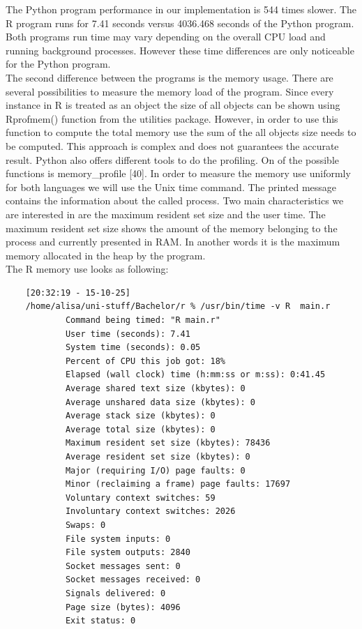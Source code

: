 \documentclass[
  twoside,
  11pt, a4paper,
  footinclude=true,
  headinclude=true,
  cleardoublepage=empty
]{scrreprt}
\begin{document}
    The Python program performance in our implementation is 544 times slower. The R program runs for 7.41 seconds versus 4036.468 seconds of the Python program. Both programs run time may vary depending on the overall CPU load and running background processes. However these time differences are only noticeable for the Python program.\\
    The second difference between the programs is the memory usage. There are several possibilities to measure the memory load of the program. Since every instance in R is treated as an object the size of all objects can be shown using Rprofmem() function from the utilities package. However, in order to use this function to compute the total memory use the sum of the all objects size needs to be computed. This approach is complex and does not guarantees the accurate result. Python also offers different tools to do the profiling. On of the possible functions is memory\_profile [40]. In order to measure the memory use uniformly for both languages we will use the Unix time command. The printed message contains the information about the called process. Two main characteristics we are interested in are the maximum resident set size and the user time. The maximum resident set size shows the amount of the memory belonging to the process and currently presented in RAM. In another words it is the maximum memory allocated in the heap by the program.\\ 
    The R memory use looks as following:
    \begin{verbatim}
    [20:32:19 - 15-10-25] 
    /home/alisa/uni-stuff/Bachelor/r % /usr/bin/time -v R  main.r
            Command being timed: "R main.r"
            User time (seconds): 7.41
            System time (seconds): 0.05
            Percent of CPU this job got: 18%
            Elapsed (wall clock) time (h:mm:ss or m:ss): 0:41.45
            Average shared text size (kbytes): 0
            Average unshared data size (kbytes): 0
            Average stack size (kbytes): 0
            Average total size (kbytes): 0
            Maximum resident set size (kbytes): 78436
            Average resident set size (kbytes): 0
            Major (requiring I/O) page faults: 0
            Minor (reclaiming a frame) page faults: 17697
            Voluntary context switches: 59
            Involuntary context switches: 2026
            Swaps: 0
            File system inputs: 0
            File system outputs: 2840
            Socket messages sent: 0
            Socket messages received: 0
            Signals delivered: 0
            Page size (bytes): 4096
            Exit status: 0
    \end{verbatim}
\end{document}
